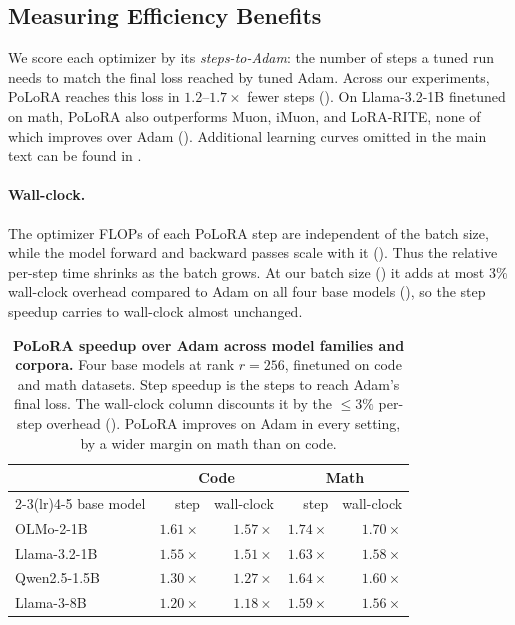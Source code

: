 \documentclass[11pt]{article}
\newcommand{\methodname}{PoLoRA\xspace}
\theoremstyle{plain}
\theoremstyle{definition}
\theoremstyle{remark}
\theoremstyle{definition}
\begin{document}
\subsection{Measuring Efficiency Benefits}
\label{sec:exp-main}
We score each optimizer by its \emph{steps-to-Adam}: the number of steps a tuned run needs to match the final loss reached by tuned Adam. Across our experiments, \methodname{} reaches this loss in $1.2$--$1.7\times$ fewer steps (). On Llama-3.2-1B finetuned on math, \methodname{} also outperforms Muon, iMuon, and LoRA-RITE, none of which improves over Adam (). Additional learning curves omitted in the main text can be found in .



\paragraph{Wall-clock.}\label{sec:exp-walltime} The optimizer FLOPs of each \methodname{} step are independent of the batch size, while the model forward
and backward passes scale with it (). Thus the relative per-step time shrinks
as the batch grows. At our batch size () it adds at most $3\%$ wall-clock overhead compared to Adam on
all four base models (), so the step speedup carries to wall-clock almost
unchanged.  

\begin{table}[t]
\centering\small
\begin{tabular}{lrrrr}
\toprule
 & \multicolumn{2}{c}{Code} & \multicolumn{2}{c}{Math} \\
\cmidrule(lr){2-3}\cmidrule(lr){4-5}
base model & step & wall-clock & step & wall-clock \\
\midrule
OLMo-2-1B & $1.61\times$ & $1.57\times$ & $1.74\times$ & $1.70\times$ \\
Llama-3.2-1B & $1.55\times$ & $1.51\times$ & $1.63\times$ & $1.58\times$ \\
Qwen2.5-1.5B & $1.30\times$ & $1.27\times$ & $1.64\times$ & $1.60\times$ \\
Llama-3-8B & $1.20\times$ & $1.18\times$ & $1.59\times$ & $1.56\times$ \\
\bottomrule
\end{tabular}
\caption{\textbf{\methodname{} speedup over Adam across model families and corpora.} Four base models at rank $r=256$, finetuned on code and math datasets. Step speedup is the steps to reach Adam's final loss. The wall-clock column discounts it by the $\le3\%$ per-step overhead (). \methodname{} improves on Adam in every setting, by a wider margin on math than on code.}
\label{tab:breadth}
\end{table}
\end{document}
